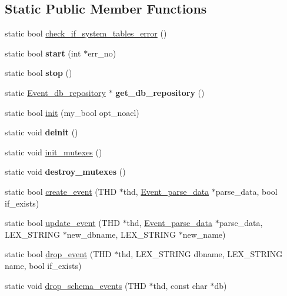 \subsection*{Static Public Member Functions}
\begin{DoxyCompactItemize}
\item 
static bool \mbox{\hyperlink{group__Event__Scheduler_ga97efaefcec61d1bb9b7e0c518c1319ce}{check\+\_\+if\+\_\+system\+\_\+tables\+\_\+error}} ()
\item 
static bool {\bfseries start} (int $\ast$err\+\_\+no)
\item 
static bool {\bfseries stop} ()
\item 
\mbox{\label{classEvents_ac2209b7df7a277a434d842b8c98aa231}} 
static \mbox{\hyperlink{classEvent__db__repository}{Event\+\_\+db\+\_\+repository}} $\ast$ {\bfseries get\+\_\+db\+\_\+repository} ()
\item 
static bool \mbox{\hyperlink{group__Event__Scheduler_gaa1df78d5847482dc1712c780dfd44b9a}{init}} (my\+\_\+bool opt\+\_\+noacl)
\item 
static void {\bfseries deinit} ()
\item 
static void \mbox{\hyperlink{group__Event__Scheduler_gaa26988f7ec7f5d0053af28a5d8586236}{init\+\_\+mutexes}} ()
\item 
\mbox{\label{classEvents_a412174206397aaaf1601bbe6ed248ba5}} 
static void {\bfseries destroy\+\_\+mutexes} ()
\item 
static bool \mbox{\hyperlink{group__Event__Scheduler_ga8fbb9616149b046c5cc59eb889d6f809}{create\+\_\+event}} (T\+HD $\ast$thd, \mbox{\hyperlink{classEvent__parse__data}{Event\+\_\+parse\+\_\+data}} $\ast$parse\+\_\+data, bool if\+\_\+exists)
\item 
static bool \mbox{\hyperlink{group__Event__Scheduler_ga7577ede664831ea99e27f45a0d91d946}{update\+\_\+event}} (T\+HD $\ast$thd, \mbox{\hyperlink{classEvent__parse__data}{Event\+\_\+parse\+\_\+data}} $\ast$parse\+\_\+data, L\+E\+X\+\_\+\+S\+T\+R\+I\+NG $\ast$new\+\_\+dbname, L\+E\+X\+\_\+\+S\+T\+R\+I\+NG $\ast$new\+\_\+name)
\item 
static bool \mbox{\hyperlink{group__Event__Scheduler_gac4837ceab76a62f91e99c63a718e7da9}{drop\+\_\+event}} (T\+HD $\ast$thd, L\+E\+X\+\_\+\+S\+T\+R\+I\+NG dbname, L\+E\+X\+\_\+\+S\+T\+R\+I\+NG name, bool if\+\_\+exists)
\item 
static void \mbox{\hyperlink{group__Event__Scheduler_ga3a0f2bbcd465f2afe81b3f88fb2bf62e}{drop\+\_\+schema\+\_\+events}} (T\+HD $\ast$thd, const char $\ast$db)

\end{DoxyCompactItemize}
